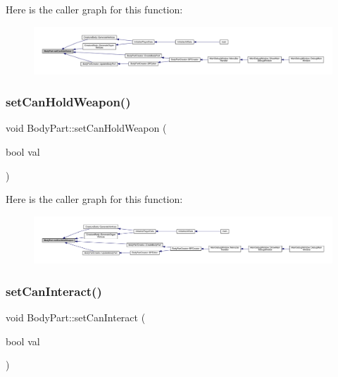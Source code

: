 Here is the caller graph for this function\+:
\nopagebreak
\begin{figure}[H]
\begin{center}
\leavevmode
\includegraphics[width=350pt]{d2/d6f/class_body_part_ad83118e7510cbab332815cd9254a6024_icgraph}
\end{center}
\end{figure}
\mbox{\label{class_body_part_af61f39aa545dacd8c1a9cf43761df85a}} 
\subsubsection{\texorpdfstring{set\+Can\+Hold\+Weapon()}{setCanHoldWeapon()}}
{\footnotesize\ttfamily void Body\+Part\+::set\+Can\+Hold\+Weapon (\begin{DoxyParamCaption}\item[{bool}]{val }\end{DoxyParamCaption})}

Here is the caller graph for this function\+:
\nopagebreak
\begin{figure}[H]
\begin{center}
\leavevmode
\includegraphics[width=350pt]{d2/d6f/class_body_part_af61f39aa545dacd8c1a9cf43761df85a_icgraph}
\end{center}
\end{figure}
\mbox{\label{class_body_part_acb68020a45ea6f0d14b963b3159317a2}} 
\subsubsection{\texorpdfstring{set\+Can\+Interact()}{setCanInteract()}}
{\footnotesize\ttfamily void Body\+Part\+::set\+Can\+Interact (\begin{DoxyParamCaption}\item[{bool}]{val }\end{DoxyParamCaption})}

